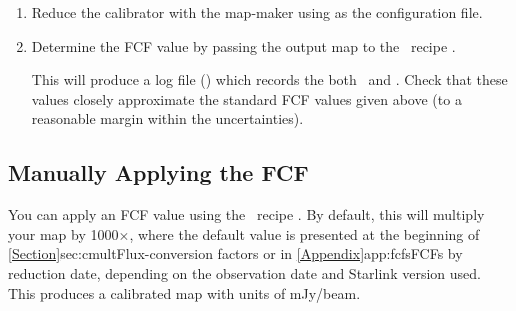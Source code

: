 \begin{enumerate}
\item Reduce the calibrator with the map-maker using
   as the configuration file.

\item Determine the FCF value by passing the output map to the
  \picard\ recipe
  .

\begin{terminalv}
\end{terminalv}

This will produce a log file () which records the
both \fcfb\ and \fcfa. Check that these values closely approximate the
standard FCF values given above (to a reasonable margin within the
uncertainties).




\end{enumerate}

\subsection{Manually Applying the FCF}
\label{subsec:ApplyingFCF}

You can apply an FCF value using the \picard\ recipe
.
By default, this will multiply your map by 1000$\times$\fcfb, where the default \fcfb
value is presented at the beginning of \cref{Section}{sec:cmult}{Flux-conversion factors}
or in \cref{Appendix}{app:fcfs}{FCFs by reduction date},
depending on the observation date and Starlink version used. This produces a
calibrated map with units of mJy/beam.

